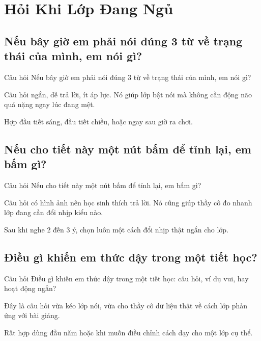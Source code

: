 \chapter{Hỏi Khi Lớp Đang Ngủ}

\section{Nếu bây giờ em phải nói đúng 3 từ về trạng thái của mình, em nói gì?}
\begin{cauhoibox}{Câu hỏi}
Nếu bây giờ em phải nói đúng 3 từ về trạng thái của mình, em nói gì?
\end{cauhoibox}
\begin{taisaocoich}
Câu hỏi ngắn, dễ trả lời, ít áp lực. Nó giúp lớp bật nói mà không cần động não quá nặng ngay lúc đang mệt.
\end{taisaocoich}
\begin{goiybien}
Hợp đầu tiết sáng, đầu tiết chiều, hoặc ngay sau giờ ra chơi.
\end{goiybien}
\ngancach

\section{Nếu cho tiết này một nút bấm để tỉnh lại, em bấm gì?}
\begin{cauhoibox}{Câu hỏi}
Nếu cho tiết này một nút bấm để tỉnh lại, em bấm gì?
\end{cauhoibox}
\begin{taisaocoich}
Câu hỏi có hình ảnh nên học sinh thích trả lời. Nó cũng giúp thầy cô đo nhanh lớp đang cần đổi nhịp kiểu nào.
\end{taisaocoich}
\begin{goiybien}
Sau khi nghe 2 đến 3 ý, chọn luôn một cách đổi nhịp thật ngắn cho lớp.
\end{goiybien}
\ngancach

\section{Điều gì khiến em thức dậy trong một tiết học?}
\begin{cauhoibox}{Câu hỏi}
Điều gì khiến em thức dậy trong một tiết học: câu hỏi, ví dụ vui, hay hoạt động ngắn?
\end{cauhoibox}
\begin{taisaocoich}
Đây là câu hỏi vừa kéo lớp nói, vừa cho thầy cô dữ liệu thật về cách lớp phản ứng với bài giảng.
\end{taisaocoich}
\begin{goiybien}
Rất hợp dùng đầu năm hoặc khi muốn điều chỉnh cách dạy cho một lớp cụ thể.
\end{goiybien}
\ngancach

